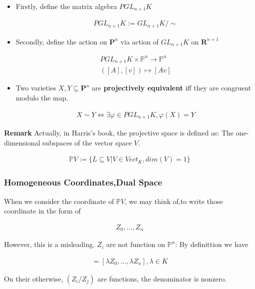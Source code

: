 \documentclass[Total.tex]{subfiles}
\begin{document}
			\begin{Def}
				\begin{itemize}
					\item Firstly, define the matrix algebra $PGL_{n+1}K$
					
					\begin{gather*}
						PGL_{n+1}K:=GL_{n+1}K/\sim
					\end{gather*}
					
					\item Secondly, define the action on $\mathbf{P}^n$ via action of $GL_{n+1}K$ on $\mathbf{R}^{n+1}$
					
					\begin{gather*}
						PGL_{n+1}K\times \mathbb{P}^n \rightarrow \mathbb{P}^n\\
						([A],[v]) \mapsto [Av]
					\end{gather*}
					
					\item Two varieties $X,Y\subseteq \mathbf{P}^n$ are \textbf{projectively equivalent} iff they are congruent modulo the map. 
					
					\begin{gather*}
						X\sim Y \Leftrightarrow \exists \varphi\in PGL_{n+1}K,\varphi(X)=Y
					\end{gather*}
				\end{itemize}
			\end{Def}
			
				\textbf{Remark} Actually, in Harris's book, the projective space is defined as: The one-dimensional subspaces of the vector space $V$.
			
			\begin{gather*}
				\mathbb{P}V:=\{L\subseteq V|V\in Vect_K,dim(V)=1\}
			\end{gather*}
			
			\subsubsection{Homogeneous Coordinates,Dual Space}
			
			\begin{example}
				When we consider the coordinate of $\mathbb{P}V$, we may think of,to write those coordinate in the form of
				
				\begin{gather*}
					Z_0,\dots,Z_n
				\end{gather*}
				
				However, this is a misleading. $Z_i$ are not function on $\mathbb{P}^n$: By definittion we have
				
				\begin{gather*}
					[Z_0,\dots,Z_n]=[\lambda Z_0,\dots,\lambda Z_n],\lambda\in K
				\end{gather*}
				
				On their otherwise, $(Z_i/Z_j)$ are functions, the denominator is nonzero. 
			\end{example}
			
\end{document}
